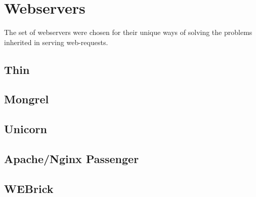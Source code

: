 \section{Webservers} %
\label{webservers}
The set of webservers were chosen for their unique ways of solving the problems
inherited in serving web-requests.

\subsection{Thin}

\subsection{Mongrel}

\subsection{Unicorn}

\subsection{Apache/Nginx Passenger}

\subsection{WEBrick}

